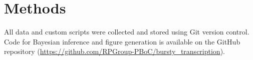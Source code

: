 \section{Methods}

All data and custom scripts were collected and stored using Git version control.
Code for Bayesian inference and figure generation is available on the GitHub
repository (\url{https://github.com/RPGroup-PBoC/bursty_transcription}).